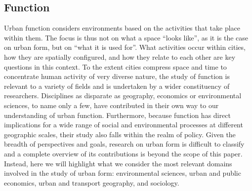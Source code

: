\subsection{Function}
\label{sec:lit_function}


Urban function considers environments based on the activities that take place
within them.
%
The focus is thus not on what a space ``looks
like'', as it is the case on urban form, but on ``what it is used for''. What
activities occur within cities, how they are spatially configured, and how
they relate to each other are key questions in this context.
%
To the extent cities compress space and time to concentrate human activity of
very diverse nature, the study of function is relevant to a variety of
fields and is undertaken by a wider constituency of researchers. Disciplines
as disparate as geography, economics or environmental sciences, to name only a
few, have contributed in their own way to our understanding of urban
function.
Furthermore, because function has direct implications for a wide range of
social and environmental processes at different geographic scales, their study
also falls within the realm of policy.
%
Given the breadth of perspectives and goals, research on urban form is
difficult to classify and a complete overview of its contributions is beyond
the scope of this paper. Instead, here we will highlight what we consider the
most relevant domains involved in the study of urban form: environmental
sciences, urban and public economics, urban and transport geography, and
sociology.

